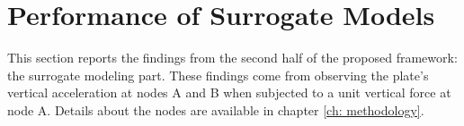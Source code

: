 %
%

\section{Performance of Surrogate Models}
\label{sec: performance of surrogate models}

This section reports the findings from the second half of the proposed framework: the surrogate modeling part.
These findings come from observing the plate's vertical acceleration at nodes A and B when subjected to a unit vertical force at node A.
Details about the nodes are available in chapter \ref{ch: methodology}.


